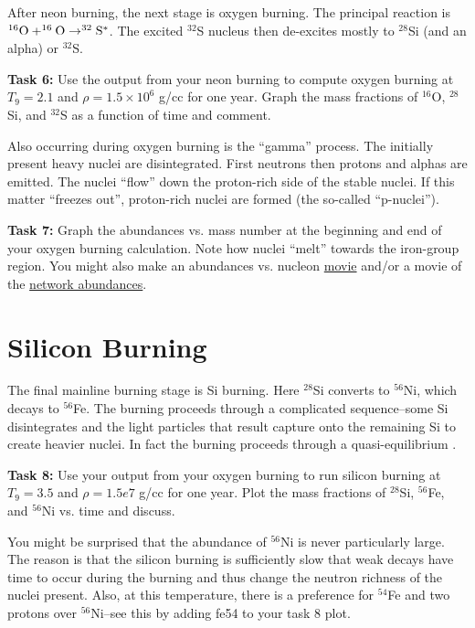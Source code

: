 \documentclass[manuscript]{aastex62}
\begin{document}
After neon burning, the next stage is oxygen burning.  The principal reaction
is $^{16}{\rm O} + ^{16}{\rm O} \to ^{32}{\rm S}^*$.  The excited $^{32}$S
nucleus then de-excites mostly to $^{28}$Si (and an alpha)
or $^{32}$S.

{\bf Task 6:}  Use the output from your neon burning to compute oxygen burning
at $T_9 = 2.1$ and $\rho = 1.5\times 10^6$ g/cc for one year.  Graph the
mass fractions of $^{16}$O, $^{28}$Si, and $^{32}$S as a function of time and
comment.

Also occurring during oxygen burning is the ``gamma'' process.  The initially
present heavy nuclei are disintegrated.  First neutrons then protons and
alphas are emitted.  The nuclei ``flow'' down the proton-rich side of the
stable nuclei.  If this matter ``freezes out'', proton-rich nuclei are
formed (the so-called ``p-nuclei'').

{\bf Task 7:}  Graph the abundances vs. mass number at the beginning and end of
your oxygen burning calculation.  Note how nuclei ``melt'' towards the
iron-group region.  You might also make an abundances vs. nucleon
\href{https://wnutils.readthedocs.io/en/latest/animate_tutorial.html#animating-the-abundances-versus-nucleon-number}{movie} and/or a movie of the
\href{https://wnutils.readthedocs.io/en/latest/animate_tutorial.html#animating-the-network-abundances}{network abundances}.

\section{Silicon Burning} \label{sec:Si}

The final mainline burning stage is Si burning.  Here $^{28}$Si converts to
$^{56}$Ni, which decays to $^{56}$Fe.  The burning proceeds through a
complicated sequence--some Si disintegrates and the light particles that result
capture onto the remaining Si to create heavier nuclei.  In fact the
burning proceeds through a quasi-equilibrium
\cite{1968ApJS...16..299B,1998ApJ...498..808M}.

{\bf Task 8:}  Use your output from your oxygen burning to run silicon burning
at $T_9 = 3.5$ and $\rho = 1.5e7$ g/cc for one year.
Plot the mass fractions of
$^{28}$Si, $^{56}$Fe, and $^{56}$Ni vs. time and discuss.

You might be surprised that the abundance of $^{56}$Ni is never particularly
large.  The reason is that the silicon burning is sufficiently slow that
weak decays have time to occur during the burning and thus change the
neutron richness of the nuclei present.  Also, at this temperature, there
is a preference for $^{54}$Fe and two protons over $^{56}$Ni--see this by
adding fe54 to your task 8 plot.
\end{document}
